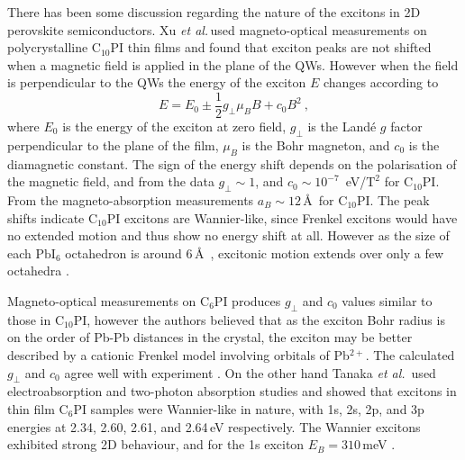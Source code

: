 There has been some discussion regarding the nature of the excitons in 2D perovskite semiconductors. Xu \textit{et al.}\,used magneto-optical measurements on polycrystalline $\textrm{C}_{10}$PI thin films and found that exciton peaks are not shifted when a magnetic field is applied in the plane of the QWs. However when the field is perpendicular to the QWs the energy of the exciton $E$ changes according to
\begin{equation}
E = E_0 \pm \frac{1}{2} g_{\bot} \mu_{B} B + c_0 B^2~,
\label{mag-shift}
\end{equation} 
where $E_0$ is the energy of the exciton at zero field, $g_{\bot}$ is the Land\'{e} $g$ factor perpendicular to the plane of the film, $\mu_B$ is the Bohr magneton, and $c_0$ is the diamagnetic constant. The sign of the energy shift depends on the polarisation of the magnetic field, and from the data $g_{\bot}\sim1$, and $c_0\sim 10^{-7}$~eV/$\textrm{T}^2$ for C$_{10}$PI. From the magneto-absorption measurements $a_B \sim12\,$\AA\, for $\textrm{C}_{10}$PI. The peak shifts indicate $\textrm{C}_{10}$PI excitons are Wannier-like, since Frenkel excitons would have no extended motion and thus show no energy shift at all. However as the size of each $\textrm{PbI}_6$ octahedron is around 6\,\AA~\cite{Ishihara1990}, excitonic motion extends over only a few octahedra \cite{Xu1991b}.

Magneto-optical measurements on C$_6$PI produces $g_{\bot}$ and $c_0$ values similar to those in $\textrm{C}_{10}$PI, however the authors believed that as the exciton Bohr radius is on the order of Pb-Pb distances in the crystal, the exciton may be better described by a cationic Frenkel model involving orbitals of Pb$^{2+}$. The calculated $g_{\bot}$ and $c_0$ agree well with experiment \cite{Kataoka1993}. On the other hand Tanaka \textit{et al.}\ used electroabsorption and two-photon absorption studies and showed that excitons in thin film $\textrm{C}_{6}$PI samples were Wannier-like in nature, with 1s, 2s, 2p, and 3p energies at 2.34, 2.60, 2.61, and 2.64\,eV respectively. The Wannier excitons exhibited strong 2D behaviour, and for the 1s exciton $E_B = 310$\,meV \cite{Tanaka2002}.


